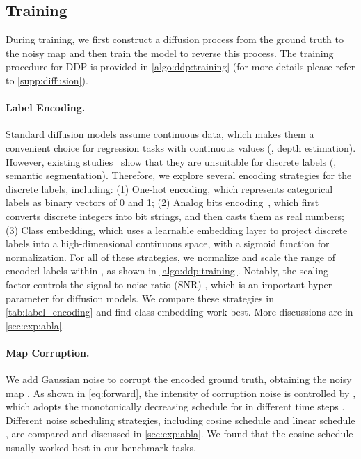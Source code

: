 \documentclass[10pt,twocolumn,letterpaper]{article}
\newcommand{\ours}[0]{DDP\xspace}
\begin{document}
\subsection{Training}
During training, we first construct a diffusion process from the ground truth  to the noisy map  and then train the model to reverse this process.
The training procedure for \ours is provided in \cref{algo:ddp:training} (for more details please refer to \cref{supp:diffusion}).



\paragraph{Label Encoding.}
\label{para:label_encoding}
Standard diffusion models assume continuous data, which makes them a convenient choice for regression tasks with continuous values (\eg, depth estimation). However, existing studies~\cite{chen2022generalist,chen2023analog} show that they are unsuitable for discrete labels (\eg, semantic segmentation).
Therefore, we explore several encoding strategies for the discrete labels, including:
(1) One-hot encoding, which represents categorical labels as binary vectors of 0 and 1;
(2) Analog bits encoding~\cite{chen2022generalist}, which first converts discrete integers into bit strings, and then casts them as real numbers;
(3) Class embedding, which uses a learnable embedding layer to project discrete labels into a high-dimensional continuous space, with a sigmoid function for normalization.
For all of these strategies, we normalize and scale the range of encoded labels within , as shown in \cref{algo:ddp:training}.
Notably, the scaling factor  controls the signal-to-noise ratio (SNR) \cite{chen2022generalist,chen2023importance}, which is an important hyper-parameter for diffusion models.
We compare these strategies in \cref{tab:label_encoding} and find class embedding work best.
More discussions are in \cref{sec:exp:abla}.


\paragraph{Map Corruption.}
We add Gaussian noise to corrupt the encoded ground truth, obtaining the noisy map .
As shown in \cref{eq:forward}, the intensity of corruption noise is controlled by , which adopts the monotonically decreasing schedule for  in different time steps .
Different noise scheduling strategies, including cosine schedule \cite{nichol2021improved} and linear schedule \cite{ho2020denoising},
are compared and discussed in \cref{sec:exp:abla}.
We found that the cosine schedule usually worked best in our benchmark tasks.
\end{document}
